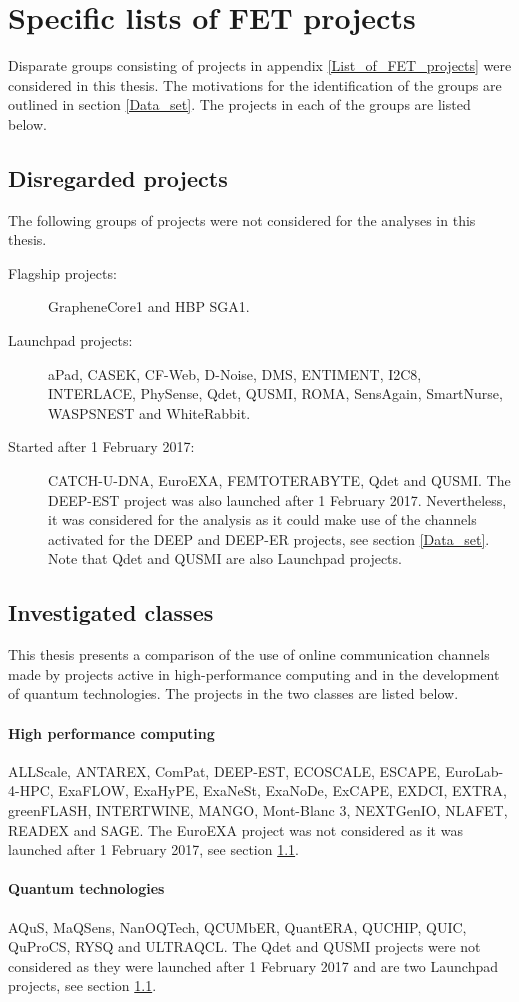 \chapter{Specific lists of FET projects} \label{Specific_lists_of_FET_projects}
Disparate groups consisting of projects in appendix \ref{List_of_FET_projects} were considered in this thesis. The motivations for the identification of the groups are outlined in section \ref{Data_set}. The projects in each of the groups are listed below.

\section{Disregarded projects} \label{Disregarded_projects}
The following groups of projects were not considered for the analyses in this thesis.

\begin{description}
 \item [Flagship projects:] GrapheneCore1 and HBP SGA1.
 \item [Launchpad projects:] aPad, CASEK, CF-Web, D-Noise, DMS, ENTIMENT, I2C8, INTERLACE, PhySense, Qdet, QUSMI, ROMA, SensAgain, SmartNurse, WASPSNEST and WhiteRabbit.
 \item [Started after 1 February 2017:] CATCH-U-DNA, EuroEXA, FEMTOTERABYTE, Qdet and QUSMI. The DEEP-EST project was also launched after 1 February 2017. Nevertheless, it was considered for the analysis as it could make use of the channels activated for the DEEP and DEEP-ER projects, see section \ref{Data_set}. Note that Qdet and QUSMI are also Launchpad projects. 
\end{description}

\section{Investigated classes}
This thesis presents a comparison of the use of online communication channels made by projects active in high-performance computing and in the development of quantum technologies. The projects in the two classes are listed below. 

\subsubsection{High performance computing}
ALLScale, ANTAREX, ComPat, DEEP-EST, ECOSCALE, ESCAPE, EuroLab-4-HPC, ExaFLOW, ExaHyPE, ExaNeSt, ExaNoDe, ExCAPE, EXDCI, EXTRA, greenFLASH, INTERTWINE, MANGO, Mont-Blanc 3, NEXTGenIO, NLAFET, READEX and SAGE. The  EuroEXA project was not considered as it was launched after 1 February 2017, see section \ref{Disregarded_projects}.

\subsubsection{Quantum technologies}
AQuS, MaQSens, NanOQTech, QCUMbER, QuantERA, QUCHIP, QUIC, QuProCS, RYSQ and ULTRAQCL. The Qdet and QUSMI projects were not considered as they were launched after 1 February 2017 and are two Launchpad projects, see section \ref{Disregarded_projects}.